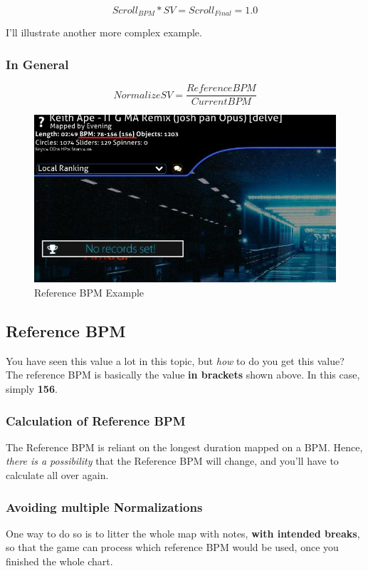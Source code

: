 \[ Scroll_{BPM} * SV = Scroll_{Final} = 1.0 \]

I'll illustrate another more complex example.



\subsubsection{In General}

\[Normalize SV = \frac{Reference BPM}{Current BPM}\]

\begin{figure}
  \includegraphics[width=\linewidth]{../part_3/imgs/normalize_img.jpg}
  \caption{Reference BPM Example}
  \label{fig:norm_ref}
\end{figure}
\subsection{Reference BPM}
You have seen this value a lot in this topic, but \textit{how} to do you get this value? The reference BPM is basically the value \textbf{in brackets} shown above.
In this case, simply \textbf{156}.

\subsubsection{Calculation of Reference BPM}
The Reference BPM is reliant on the longest duration mapped on a BPM. Hence, \textit{there is a possibility} that the Reference BPM will change, and you'll have to calculate all over again.

\subsubsection{Avoiding multiple Normalizations}
One way to do so is to litter the whole map with notes, \textbf{with intended breaks}, so that the game can process which reference BPM would be used, once you finished the whole chart.

